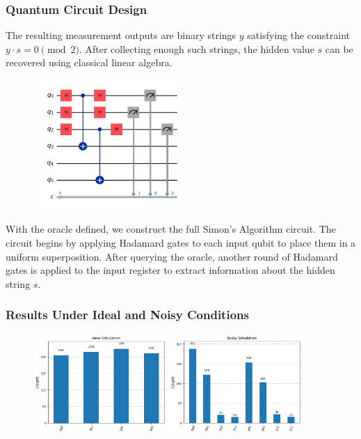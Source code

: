 \documentclass[12pt]{article}
\begin{document}
\subsubsection*{Quantum Circuit Design}

The resulting measurement outputs are binary strings $y$ satisfying the constraint $y \cdot s = 0 \pmod{2}$. After collecting enough such strings, the hidden value $s$ can be recovered using classical linear algebra.

\begin{figure}[H]
    \centering
    \includegraphics[width=0.50\textwidth]{simon_circuit.png}
    \label{fig:simon_circuit}
\end{figure}

With the oracle defined, we construct the full Simon's Algorithm circuit. The circuit begins by applying Hadamard gates to each input qubit to place them in a uniform superposition. After querying the oracle, another round of Hadamard gates is applied to the input register to extract information about the hidden string $s$.

\subsubsection*{Results Under Ideal and Noisy Conditions}

\begin{figure}[H]
    \centering
    \includegraphics[width=0.45\textwidth]{ideal.png}
    \hfill
    \includegraphics[width=0.45\textwidth]{noisy.png}
    \label{fig:histograms}
\end{figure}
\end{document}
